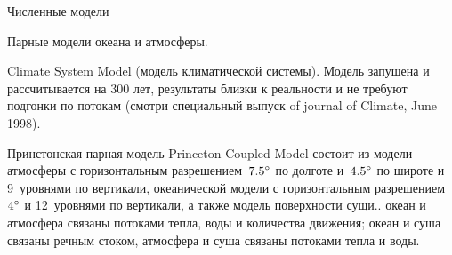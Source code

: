 \begin{chapter}{Численные модели}
\begin{section}{Парные модели океана и атмосферы.}
\begin{paragraph}{Climate System Model (модель климатической системы).}
Модель запушена и рассчитывается на 300 лет, результаты близки к
реальности и не требуют подгонки по потокам (смотри специальный выпуск
of journal of Climate, June 1998).
%
\end{paragraph}

\begin{paragraph}{Принстонская парная модель Princeton Coupled Model}
состоит из модели атмосферы с горизонтальным разрешением~${7.5}^\circ$ по
долготе и~${4.5}^\circ$ по широте и 9~уровнями по вертикали, океанической
модели с горизонтальным разрешением~${4}^\circ$ и 12~уровнями по вертикали, а
также модель поверхности сущи.. океан и атмосфера связаны потоками
тепла, воды и количества движения; океан и суша связаны речным стоком,
атмосфера и суша связаны потоками тепла и воды.
%
\end{paragraph}


\end{section}
\end{chapter}

